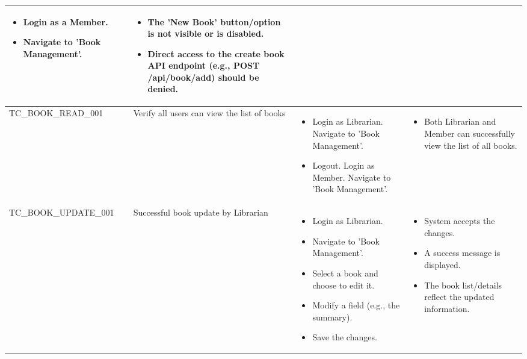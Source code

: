 \begin{longtable}{|>{\scriptsize\raggedright\arraybackslash}p{4.2cm}|>{\raggedright\arraybackslash}p{3.5cm}|>{\raggedright\arraybackslash}p{3.5cm}|>{\raggedright\arraybackslash}p{3.8cm}|}
\begin{itemize}[noitemsep, topsep=0pt, partopsep=0pt, leftmargin=*]
        \item Login as a Member.
        \item Navigate to 'Book Management'.
    \end{itemize} & 
    \begin{itemize}[noitemsep, topsep=0pt, partopsep=0pt, leftmargin=*]
        \item The 'New Book' button/option is not visible or is disabled.
        \item Direct access to the create book API endpoint (e.g., POST /api/book/add) should be denied.
    \end{itemize} \\ \hline
TC\_BOOK\_READ\_001 & Verify all users can view the list of books & 
    \begin{itemize}[noitemsep, topsep=0pt, partopsep=0pt, leftmargin=*]
        \item Login as Librarian. Navigate to 'Book Management'.
        \item Logout. Login as Member. Navigate to 'Book Management'.
    \end{itemize} & 
    \begin{itemize}[noitemsep, topsep=0pt, partopsep=0pt, leftmargin=*]
        \item Both Librarian and Member can successfully view the list of all books.
    \end{itemize} \\ \hline
TC\_BOOK\_UPDATE\_001 & Successful book update by Librarian & 
    \begin{itemize}[noitemsep, topsep=0pt, partopsep=0pt, leftmargin=*]
        \item Login as Librarian.
        \item Navigate to 'Book Management'.
        \item Select a book and choose to edit it.
        \item Modify a field (e.g., the summary).
        \item Save the changes.
    \end{itemize} & 
    \begin{itemize}[noitemsep, topsep=0pt, partopsep=0pt, leftmargin=*]
        \item System accepts the changes.
        \item A success message is displayed.
        \item The book list/details reflect the updated information.
    \end{itemize} \\ \hline

\end{longtable}
